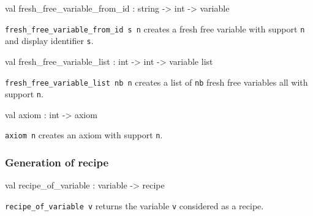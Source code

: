 \label{val:Recipe.fresh-underscorefree-underscorevariable-underscorefrom-underscoreid}\begin{ocamldoccode}
val fresh_free_variable_from_id : string -> int -> variable
\end{ocamldoccode}
\begin{ocamldocdescription}
{\tt{fresh\_free\_variable\_from\_id s n}} creates a fresh free variable with support {\tt{n}} and display identifier {\tt{s}}.


\end{ocamldocdescription}




\label{val:Recipe.fresh-underscorefree-underscorevariable-underscorelist}\begin{ocamldoccode}
val fresh_free_variable_list : int -> int -> variable list
\end{ocamldoccode}
\begin{ocamldocdescription}
{\tt{fresh\_free\_variable\_list nb n}} creates a list of {\tt{nb}} fresh free variables all with support {\tt{n}}.


\end{ocamldocdescription}




\label{val:Recipe.axiom}\begin{ocamldoccode}
val axiom : int -> axiom
\end{ocamldoccode}
\begin{ocamldocdescription}
{\tt{axiom n}} creates an axiom with support {\tt{n}}.


\end{ocamldocdescription}




\subsubsection{Generation of recipe}




\label{val:Recipe.recipe-underscoreof-underscorevariable}\begin{ocamldoccode}
val recipe_of_variable : variable -> recipe
\end{ocamldoccode}
\begin{ocamldocdescription}
{\tt{recipe\_of\_variable v}} returns the variable {\tt{v}} considered as a recipe.


\end{ocamldocdescription}




